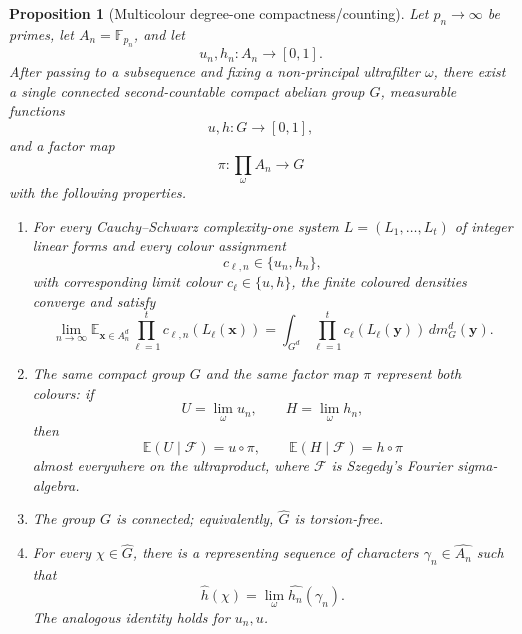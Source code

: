 \documentclass[11pt]{article}
\numberwithin{equation}{section}
\newtheorem{proposition}[theorem]{Proposition}
\newcommand{\E}{\mathbb E}
\newcommand{\F}{\mathbb F}
\newcommand{\1}{\mathbf 1}
\newcommand{\calF}{\mathcal F}
\begin{document}
\begin{proposition}[Multicolour degree-one compactness/counting]
\label{prop:multicolour-compactness}
Let \(p_n\to\infty\) be primes, let \(A_n=\F_{p_n}\), and let
\[
        u_n,h_n:A_n\to[0,1].
\]
After passing to a subsequence and fixing a non-principal ultrafilter
\(\omega\), there exist a single connected second-countable compact
abelian group \(G\), measurable functions
\[
        u,h:G\to[0,1],
\]
and a factor map
\[
        \pi:\prod_\omega A_n\to G
\]
with the following properties.

\begin{enumerate}[label=(\alph*)]
\item For every Cauchy--Schwarz complexity-one system
\(L=(L_1,\ldots,L_t)\) of integer linear forms and every colour assignment
\[
        c_{\ell,n}\in\{u_n,h_n\},
\]
with corresponding limit colour \(c_\ell\in\{u,h\}\), the finite coloured
densities converge and satisfy
\[
        \lim_{n\to\infty}
        \E_{\mathbf x\in A_n^d}
        \prod_{\ell=1}^t c_{\ell,n}(L_\ell(\mathbf x))
        =
        \int_{G^d}
        \prod_{\ell=1}^t c_\ell(L_\ell(\mathbf y))\,dm_G^d(\mathbf y).
\]

\item The same compact group \(G\) and the same factor map \(\pi\)
represent both colours: if
\[
        U=\lim_\omega u_n,
        \qquad
        H=\lim_\omega h_n,
\]
then
\[
        \E(U\mid\calF)=u\circ\pi,
        \qquad
        \E(H\mid\calF)=h\circ\pi
\]
almost everywhere on the ultraproduct, where \(\calF\) is Szegedy's
Fourier sigma-algebra.

\item The group \(G\) is connected; equivalently, \(\widehat G\) is
torsion-free.

\item For every \(\chi\in\widehat G\), there is a representing sequence of
characters \(\gamma_n\in\widehat{A_n}\) such that
\[
        \widehat h(\chi)
        =
        \lim_\omega \widehat{h_n}(\gamma_n).
\]
The analogous identity holds for \(u_n,u\).
\end{enumerate}
\end{proposition}
\end{document}
